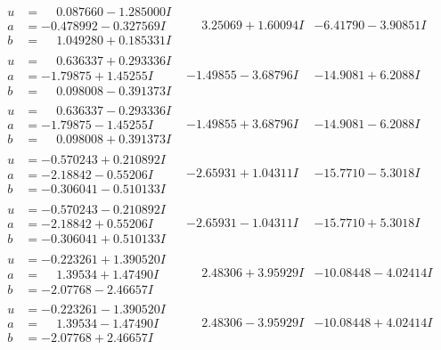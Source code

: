 \documentclass[1p]{elsarticle_modified}
\theoremstyle{definition}
\begin{document}
$$\begin{array}{c|c|c}
\begin{aligned}
u &= \phantom{-}0.087660 - 1.285000 I \\
a &= -0.478992 - 0.327569 I \\
b &= \phantom{-}1.049280 + 0.185331 I\end{aligned}
 & \phantom{-}3.25069 + 1.60094 I & -6.41790 - 3.90851 I \\ \hline\begin{aligned}
u &= \phantom{-}0.636337 + 0.293336 I \\
a &= -1.79875 + 1.45255 I \\
b &= \phantom{-}0.098008 - 0.391373 I\end{aligned}
 & -1.49855 - 3.68796 I & -14.9081 + 6.2088 I \\ \hline\begin{aligned}
u &= \phantom{-}0.636337 - 0.293336 I \\
a &= -1.79875 - 1.45255 I \\
b &= \phantom{-}0.098008 + 0.391373 I\end{aligned}
 & -1.49855 + 3.68796 I & -14.9081 - 6.2088 I \\ \hline\begin{aligned}
u &= -0.570243 + 0.210892 I \\
a &= -2.18842 - 0.55206 I \\
b &= -0.306041 - 0.510133 I\end{aligned}
 & -2.65931 + 1.04311 I & -15.7710 - 5.3018 I \\ \hline\begin{aligned}
u &= -0.570243 - 0.210892 I \\
a &= -2.18842 + 0.55206 I \\
b &= -0.306041 + 0.510133 I\end{aligned}
 & -2.65931 - 1.04311 I & -15.7710 + 5.3018 I \\ \hline\begin{aligned}
u &= -0.223261 + 1.390520 I \\
a &= \phantom{-}1.39534 + 1.47490 I \\
b &= -2.07768 - 2.46657 I\end{aligned}
 & \phantom{-}2.48306 + 3.95929 I & -10.08448 - 4.02414 I \\ \hline\begin{aligned}
u &= -0.223261 - 1.390520 I \\
a &= \phantom{-}1.39534 - 1.47490 I \\
b &= -2.07768 + 2.46657 I\end{aligned}
 & \phantom{-}2.48306 - 3.95929 I & -10.08448 + 4.02414 I \\ \hline\begin{aligned}

\end{aligned}
\end{array}$$
\end{document}
